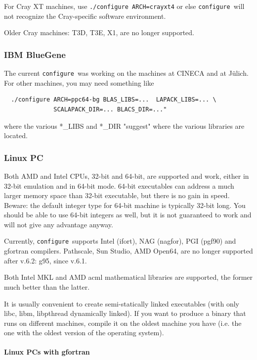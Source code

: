 \documentclass[12pt,a4paper]{article}
\def\configure{\texttt{configure}}
\begin{document}
For Cray XT machines, use \texttt{./configure ARCH=crayxt4} or else
\configure\ will not recognize the Cray-specific software environment.

Older Cray machines: T3D, T3E, X1, are no longer supported.

\subsubsection{IBM BlueGene}

The current \configure\ was working on the machines at CINECA and at J\"ulich.
For other machines, you may need something like
\begin{verbatim}
  ./configure ARCH=ppc64-bg BLAS_LIBS=...  LAPACK_LIBS=... \
              SCALAPACK_DIR=... BLACS_DIR=..."
\end{verbatim}
where the various *\_LIBS and *\_DIR "suggest" where the various libraries
are located.

\subsubsection{Linux PC}

Both AMD and Intel CPUs, 32-bit and 64-bit, are supported and work,
either in 32-bit emulation and in 64-bit mode. 64-bit executables
can address a much larger memory space than 32-bit executable, but
there is no gain in speed.
Beware: the default integer type for 64-bit machine is typically
32-bit long. You should be able to use 64-bit integers as well,
but it is not guaranteed to work and will not give
any advantage anyway.

Currently, \configure\ supports Intel (ifort), NAG (nagfor), PGI (pgf90)
and gfortran compilers. Pathscale, Sun Studio, AMD Open64, are no
longer supported after v.6.2: g95, since v.6.1.

Both Intel MKL and AMD acml mathematical libraries are supported, the
former much better than the latter.

It is usually convenient to create semi-statically linked executables (with only
libc, libm, libpthread dynamically linked). If you want to produce a binary
that runs on different machines, compile it on the oldest machine you have
(i.e. the one with the oldest version of the operating system).

\paragraph{Linux PCs with gfortran}
\end{document}
